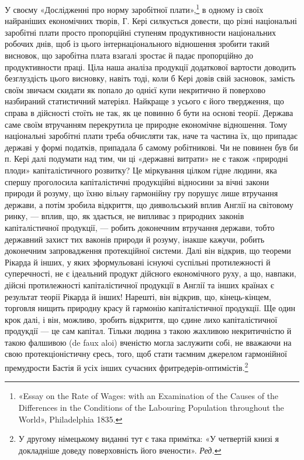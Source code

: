 У своєму «Дослідженні про норму заробітної плати»,\footnote{
«Essay on the Rate of Wages: with an Examination of the Causes
of the Differences in the Conditions of the Labouring Population throughout
the World», Philadelphia 1835.
} в одному із своїх найраніших економічних
творів, Г. Кері силкується
довести, що різні національні заробітні плати просто пропорційні
ступеням продуктивности національних робочих днів,
щоб із цього інтернаціонального відношення зробити такий висновок,
що заробітна плата взагалі зростає й падає пропорційно
до продуктивности праці. Ціла наша аналіза продукції додаткової
вартости доводить безглуздість цього висновку, навіть тоді,
коли б Кері довів свій засновок, замість своїм звичаєм скидати
як попало до однієї купи некритично й поверхово назбираний
статистичний матеріял. Найкраще з усього є його твердження,
що справа в дійсності стоїть не так, як це повинно б бути на
основі теорії. Держава саме своїм втручанням перекрутила це природне
економічне відношення. Тому національні заробітні плати
треба обчисляти так, наче та частина їх, що припадає державі
у формі податків, припадала б самому робітникові. Чи не повинен
був би п. Кері далі подумати над тим, чи ці «державні витрати»
не є також «природні плоди» капіталістичного розвитку? Це міркування
цілком гідне людини, яка спершу проголосила капіталістичні
продукційні відносини за вічні закони природи й розуму,
що їхню вільну гармонійну гру порушує лише втручання держави,
а потім зробила відкриття, що диявольський вплив Англії
на світовому ринку, — вплив, що, як здається, не випливає з
природних законів капіталістичної продукції, — робить доконечним
втручання держави, тобто державний захист тих ваконів
природи й розуму, інакше кажучи, робить доконечним запровадження
протекційної системи. Далі він відкрив, що теореми
Рікарда й інших, у яких зформульовані існуючі суспільні протилежності
й суперечності, не є ідеальний продукт дійсного економічного
руху, а що, навпаки, дійсні протилежності капіталістичної
продукції в Англії та інших країнах є результат теорії
Рікарда й інших! Нарешті, він відкрив, що, кінець-кінцем,
торговля нищить природну красу й гармонію капіталістичної
продукції. Ще один крок далі, і він, можливо, зробить відкриття,
що єдине лихо капіталістичної продукдії — це сам капітал.
Тільки людина з такою жахливою некритичністю й такою фалшивою
(de faux aloi) вченістю могла заслужити собі, не вважаючи
на свою протекціоністичну єресь, того, щоб стати таємним джерелом
гармонійної премудрости Бастія й усіх інших сучасних
фритредерів-оптимістів.\footnote*{
У другому німецькому виданні тут є така примітка: «У четвертій
книзі я докладніше доведу поверховність його вчености». \emph{Ред.}
}
